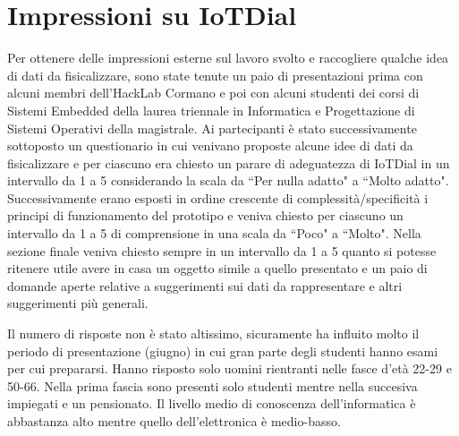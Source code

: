 \documentclass[12pt,a4paper]{report}
\begin{document}
\section{Impressioni su IoTDial} %
Per ottenere delle impressioni esterne sul lavoro svolto e raccogliere qualche idea di dati da fisicalizzare, sono state tenute un paio di
presentazioni prima con alcuni membri dell'HackLab Cormano e poi con alcuni studenti dei corsi di Sistemi Embedded della laurea triennale
in Informatica e Progettazione di Sistemi Operativi della magistrale.
Ai partecipanti è stato successivamente sottoposto un questionario in cui venivano proposte alcune idee di dati da fisicalizzare e per ciascuno
era chiesto un parare di adeguatezza di IoTDial in un intervallo da 1 a 5 considerando la scala da ``Per nulla adatto" a ``Molto adatto".
Successivamente erano esposti in ordine crescente di complessità/specificità i principi di funzionamento del prototipo e veniva chiesto per
ciascuno un intervallo da 1 a 5 di comprensione in una scala da ``Poco" a ``Molto".
Nella sezione finale veniva chiesto sempre in un intervallo da 1 a 5 quanto si potesse ritenere utile avere in casa un oggetto simile a quello
presentato e un paio di domande aperte relative a suggerimenti sui dati da rappresentare e altri suggerimenti più generali.

Il numero di risposte non è stato altissimo, sicuramente ha influito molto il periodo di presentazione (giugno) in cui gran parte degli
studenti hanno esami per cui prepararsi.
Hanno risposto solo uomini rientranti nelle fasce d'età 22-29 e 50-66. Nella prima fascia sono presenti solo studenti mentre nella succesiva
impiegati e un pensionato. Il livello medio di conoscenza dell'informatica è abbastanza alto mentre quello dell'elettronica è medio-basso.
\end{document}
